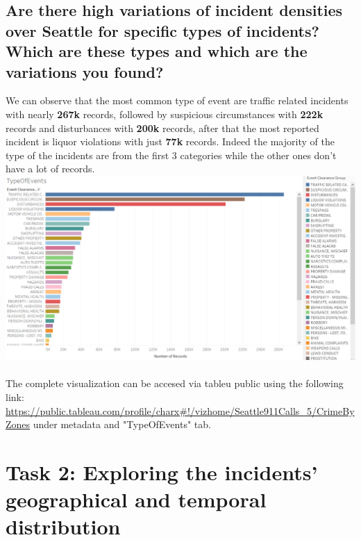 \documentclass{article}
\begin{document}
\subsection{Are there high variations of incident densities over Seattle for	 specific	 types of incidents?	Which	are	these	types	and	which	are	the	variations	you	found?}
    We can observe that the most common type of event are traffic related incidents with nearly \textbf{267k} records, followed by suspicious circumstances with \textbf{222k} records and disturbances with \textbf{200k} records, after that the most reported incident is liquor violations with just \textbf{77k} records. Indeed the majority of the type of the incidents are from the first 3 categories while the other ones don't have a lot of records. 
    \\
    \includegraphics[width=\textwidth]{VisualAnalytics/Assignment2/images/TypeOfEvents.PNG}
    \\\\
        The complete visualization can be accesed via tableu public using the following link:
        \url{https://public.tableau.com/profile/charx#!/vizhome/Seattle911Calls_5/CrimeByZones} under metadata and "TypeOfEvents" tab.
        
\section{Task	2:	Exploring	the	incidents’	geographical	and	temporal	distribution}
\end{document}
